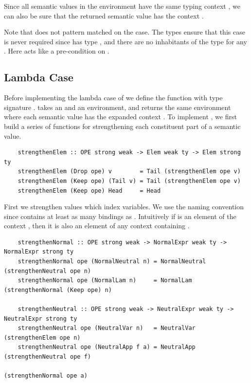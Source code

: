 Since all semantic values in the environment have the same typing context , we can also be sure that the returned semantic value has the context .

Note that  does not pattern matched on the  case. The types ensure that this case is never required since  has type , and there are no inhabitants of the type  for any . Here  acts like a pre-condition on .


\subsection{Lambda Case}
\label{subsect:typedEvalLamCase}

Before implementing the lambda case of  we define the function  with type signature .  takes an  and an environment, and returns the same environment where each semantic value has the expanded context . To implement , we first build a series of functions for strengthening each constituent part of a semantic value.

\begin{lstlisting}
    strengthenElem :: OPE strong weak -> Elem weak ty -> Elem strong ty
    strengthenElem (Drop ope) v        = Tail (strengthenElem ope v)
    strengthenElem (Keep ope) (Tail v) = Tail (strengthenElem ope v)
    strengthenElem (Keep ope) Head     = Head
\end{lstlisting}

First we strengthen  values which index variables. We use the naming convention  since  contains at least as many bindings as . 
Intuitively if  is an element of the context , then it is also an element of any context  containing .



\begin{lstlisting} 
    strengthenNormal :: OPE strong weak -> NormalExpr weak ty -> NormalExpr strong ty
    strengthenNormal ope (NormalNeutral n) = NormalNeutral (strengthenNeutral ope n)
    strengthenNormal ope (NormalLam n)     = NormalLam (strengthenNormal (Keep ope) n)

    strengthenNeutral :: OPE strong weak -> NeutralExpr weak ty -> NeutralExpr strong ty
    strengthenNeutral ope (NeutralVar n)   = NeutralVar (strengthenElem ope n)
    strengthenNeutral ope (NeutralApp f a) = NeutralApp (strengthenNeutral ope f) 
                                                        (strengthenNormal ope a) 

\end{lstlisting}

